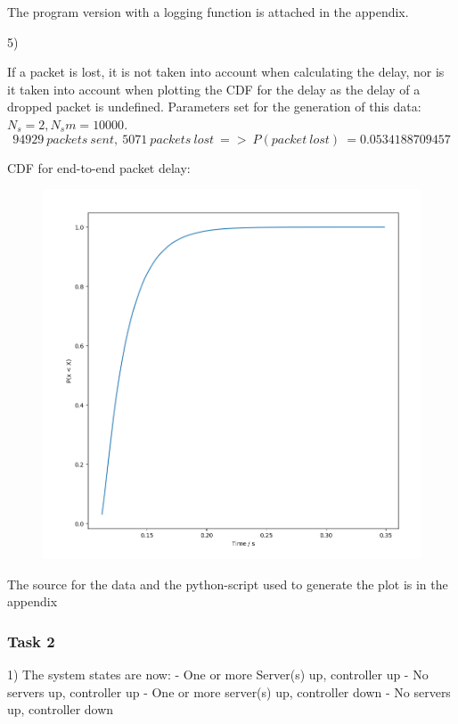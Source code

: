 \documentclass[11pt]{article}
\begin{document}
The program version with a logging function is attached in the appendix.

5)

If a packet is lost, it is not taken into account when calculating the delay, nor is it taken into account when plotting the CDF for the delay as the delay of a dropped packet is undefined.
Parameters set for the generation of this data: $N_s = 2, N_sm = 10000$.
$$94929\ packets\ sent,\ 5071\ packets\ lost\ =>\ P(packet\ lost)\ = 0.0534188709457$$

CDF for end-to-end packet delay:

\begin{figure}[H]
	\includegraphics[width=\textwidth]{cdf_plot.png}
	\centering
\end{figure}

The source for the data and the python-script used to generate the plot is in the appendix


\subsubsection{Task 2}

1) The system states are now:
- One or more Server(s) up, controller up
- No servers up, controller up
- One or more server(s) up, controller down
- No servers up, controller down
\end{document}
